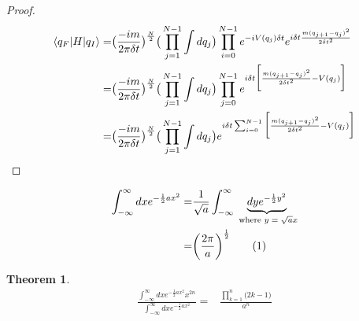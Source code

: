 \documentclass[]{article}
\newcommand\numberthis{\addtocounter{equation}{1}\tag{\theequation}}
\newtheorem{thm}{Theorem}
\begin{document}
\begin{proof}
	\begin{align*}
		\braket{q_F\vert H\vert q_I} =& \big(\frac{-i m}{2\pi \delta t}\big)^\frac{N}{2} \big(\prod_{j=1}^{N-1} \int dq_j\big) \prod_{i=0}^{N-1} e^{-i V(q_j) \delta t} e^{i \delta t \frac{m (q_{j+1}-q_j)^2}{2  {\delta t}^2}}\\
		=& \big(\frac{-i m}{2\pi \delta t}\big)^\frac{N}{2} \big(\prod_{j=1}^{N-1} \int dq_j\big) \prod_{j=0}^{N-1}  e^{i \delta t \bigg[\frac{m (q_{j+1}-q_j)^2}{2  {\delta t}^2} - V(q_j)\bigg]}\\
		=& \big(\frac{-i m}{2\pi \delta t}\big)^\frac{N}{2} \big(\prod_{j=1}^{N-1} \int dq_j\big)  e^{i \delta t \sum_{i=0}^{N-1}\bigg[\frac{m (q_{j+1}-q_j)^2}{2  {\delta t}^2} - V(q_j)\bigg]}
	\end{align*}
\end{proof}

\begin{align*}
	\int_{-\infty}^{\infty} dx e^{-\frac{1}{2}ax^2} =& \frac{1}{\sqrt{a}}\int_{-\infty}^{\infty} \underbrace{dy e^{-\frac{1}{2}y^2}}_\text{ where $y=\sqrt{a}x$} \\
	=& \bigg(\frac{2\pi}{a}\bigg)^\frac{1}{2} \numberthis \label{eq:integral:gaussian}
\end{align*}
\begin{thm}
	\begin{align*}
		\frac{\int_{-\infty}^\infty dx e^{-\frac{1}{2}ax^2}x^{2n}}{\int_{-\infty}^\infty dx e^{-\frac{1}{2}ax^2}} =&\frac{\prod_{k=1}^{n}\big(2k-1\big)}{a^n}
	\end{align*}
\end{thm}
\end{document}
